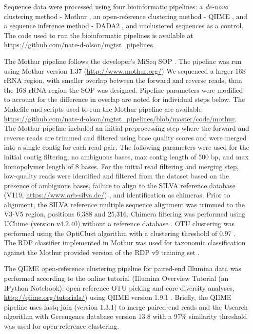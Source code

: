 \documentclass{bmcart}
\begin{document}
Sequence data were processed using four bioinformatic pipelines: a
\emph{de-novo} clustering method - Mothur
\cite{schloss2009introducing}, an open-reference clustering method -
QIIME \cite{Caporaso2010}, and a sequence inference method - DADA2
\cite{callahan2016dada2}, and unclustered sequences as a control.
The code used to run the bioinformatic pipelines is available at
\url{https://github.com/nate-d-olson/mgtst_pipelines}.

The Mothur pipeline follows the developer's MiSeq SOP
\cite{schloss2009introducing,kozich2013development}. The pipeline
was run using Mothur version 1.37 (\url{http://www.mothur.org/}) We
sequenced a larger 16S rRNA region, with smaller overlap between the
forward and reverse reads, than the 16S rRNA region the SOP was
designed. Pipeline parameters were modified to account for the
difference in overlap are noted for individual steps below. The Makefile
and scripts used to run the Mothur pipeline are available
\url{https://github.com/nate-d-olson/mgtst_pipelines/blob/master/code/mothur}.
The Mothur pipeline included an initial preprocessing step where the
forward and reverse reads are trimmed and filtered using base quality
scores and were merged into a single contig for each read pair. The
following parameters were used for the initial contig filtering, no
ambiguous bases, max contig length of 500 bp, and max homopolymer length
of 8 bases. For the initial read filtering and merging step, low-quality
reads were identified and filtered from the dataset based on the
presence of ambiguous bases, failure to align to the SILVA reference
database (V119, \url{https://www.arb-silva.de/})
\cite{quast2012silva}, and identification as chimeras. Prior to
alignment, the SILVA reference multiple sequence alignment was trimmed
to the V3-V5 region, positions 6,388 and 25,316. Chimera filtering was
performed using UChime (version v4.2.40) without a reference database
\cite{edgar2011uchime}. OTU clustering was performed using the
OptiClust algorithm with a clustering threshold of 0.97
\cite{westcott2017opticlust}. The RDP classifier implemented in
Mothur was used for taxonomic classification against the Mothur provided
version of the RDP v9 training set \cite{wang2007naive}.

The QIIME open-reference clustering pipeline for paired-end Illumina
data was performed according to the online tutorial (Illumina Overview
Tutorial (an IPython Notebook): open reference OTU picking and core
diversity analyses, \url{http://qiime.org/tutorials/}) using QIIME
version 1.9.1 \cite{Caporaso2010}. Briefly, the QIIME pipeline uses
fastq-join (version 1.3.1) to merge paired-end reads
\cite{aronesty2011ea} and the Usearch algorithm
\cite{edgar2010search} with Greengenes database version 13.8 with a
97\% similarity threshold \cite{desantis2006greengenes} was used for
open-reference clustering.
\end{document}
